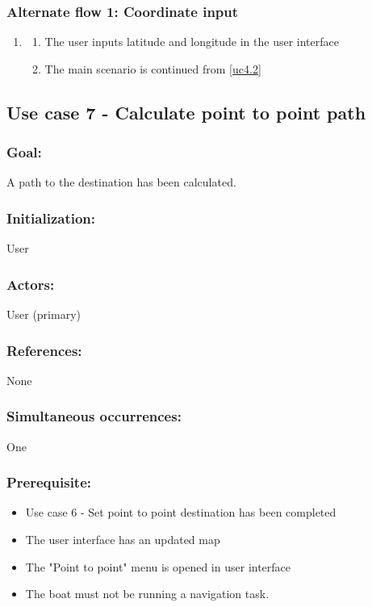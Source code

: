 \begin{framed}
	\subsubsection*{Alternate flow 1: Coordinate input}
	\begin{enumerate}
		\item 
		\begin{enumerate}
			\item The user inputs latitude and longitude in the user interface
			\item The main scenario is continued from \ref{uc4.2}
		\end{enumerate}
	\end{enumerate}
\end{framed}	

\begin{framed}
	\subsection{Use case 7 - Calculate point to point path}
	\subsubsection*{Goal:}
	A path to the destination has been calculated.
	
	\subsubsection*{Initialization:}
	User
	
	\subsubsection*{Actors:}
	User (primary)
	
	\subsubsection*{References:}
	None
	
	\subsubsection*{Simultaneous occurrences:}
	One 
	
	\subsubsection*{Prerequisite:}
	\begin{itemize}
		\item Use case 6 - Set point to point destination has been completed
		\item The user interface has an updated map
		\item The "Point to point" menu is opened in user interface
		\item The boat must not be running a navigation task.
	\end{itemize}
	

\end{framed}
